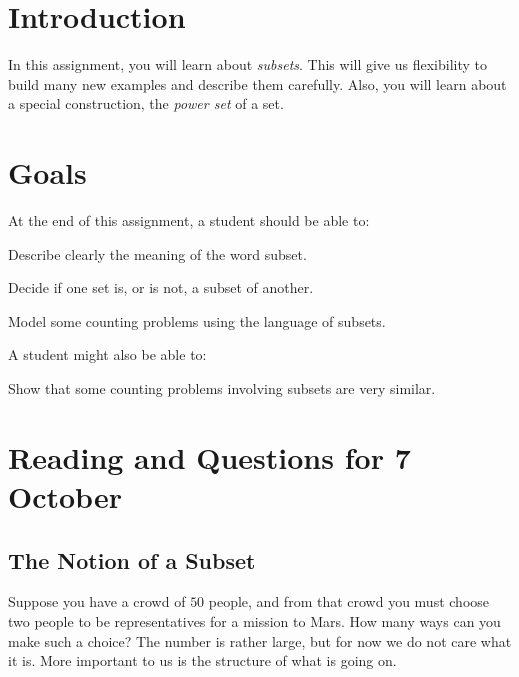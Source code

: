 \documentclass[12pt,letterpaper]{article}
\theoremstyle{definition}
\begin{document}
\setlength{\parskip}{1ex plus 0.5ex minus 0.2ex}
\setlength{\parindent}{0pt}

\pagestyle{fancy}
\cfoot{}

\section*{Introduction}
In this assignment, you will learn about \emph{subsets}. This will give us flexibility to build many new examples and describe them carefully. Also, you will learn about a special  construction, the \emph{power set} of a set.

\section*{Goals}
At the end of this assignment, a student should be able to:
\begin{compactitem}
\item Describe clearly the meaning of the word subset.
\item Decide if one set is, or is not, a subset of another.
\item Model some counting problems using the language of subsets.
\end{compactitem}
A student might also be able to:
\begin{compactitem}
\item Show that some counting problems involving subsets are very similar.
\end{compactitem}

\section*{Reading and Questions for 7 October}

\subsection*{The Notion of a Subset}
Suppose you have a crowd of $50$ people, and from that crowd you must choose two people to be representatives for a mission to Mars. 
How many ways can you make such a choice? 
The number is rather large, but for now we do not care what it is. 
More important to us is the structure of what is going on.
\end{document}
